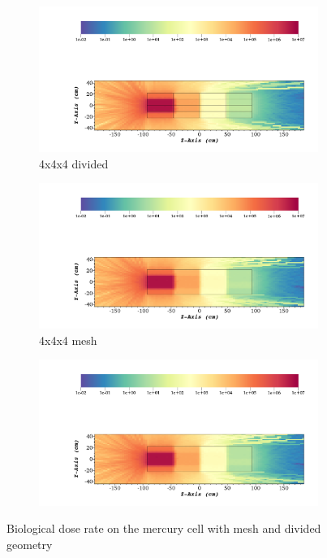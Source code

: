 \begin{figure}[H]
	\begin{subfigure}[t]{0.5\textwidth}
		\includegraphics[width=\linewidth, trim={5cm 1cm 2cm 16cm},clip]{../figs/toy_p1/dose_VPI_4x_split.png}
		\caption{4x4x4 divided}
		\label{fig:1dose_4x_split}
	\end{subfigure}\hfill
	\begin{subfigure}[t]{0.5\textwidth}
		\includegraphics[width=\linewidth, trim={5cm 1cm 2cm 16cm},clip]{../figs/toy_p1/dose_VPI_4x_mesh.png}
		\caption{4x4x4 mesh}
		\label{fig:1dose_4x_mesh}
	\end{subfigure}

	\begin{subfigure}[t]{1.0\textwidth}
		\centering
		\includegraphics[width=\linewidth, trim={5cm 25cm 2cm 2cm},clip]{../figs/toy_p1/dose_VPI_4x_mesh.png}
		\label{fig:1legend}
	\end{subfigure}
	\caption{Biological dose rate on the mercury cell with mesh and divided geometry}
	\label{fig:1dose}
\end{figure}
